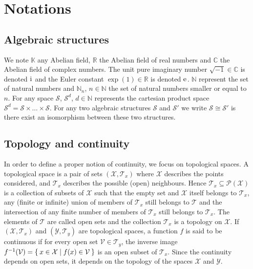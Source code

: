 
\section{Notations}

\subsection{Algebraic structures}
\label{sec:notations}
We note $\mathbb{K}$ any Abelian field, $\mathbb{R}$ the Abelian field of real numbers and $\mathbb{C}$ the Abelian field of complex numbers. The unit pure imaginary number $\sqrt{-1}\in\mathbb{C}$ is denoted ${\mathrm{i}\mkern1mu}$ and the Euler constant $\exp(1)\in\mathbb{R}$ is denoted $\mathrm{e}\mkern1mu$. $\mathbb{N}$ represent the set of natural numbers and $\mathbb{N}_n$, $n\in\mathbb{N}$ the set of natural numbers smaller or equal to $n$. For any space $\mathcal{S}$, $\mathcal{S}^d$, $d\in\mathbb{N}$ represents the cartesian product space $\mathcal{S}^d=\mathcal{S}\times \ldots \times \mathcal{S}$. For any two algebraic structures $\mathcal{S}$ and $\mathcal{S}'$ we write $\mathcal{S}\cong\mathcal{S}'$ is there exist an isomorphism between these two structures.

\subsection{Topology and continuity}
In order to define a proper notion of continuity, we focus on topological spaces. A topological space is a pair of sets $(\mathcal{X},\mathcal{T}_x)$ where $\mathcal{X}$ describes the points considered, and $\mathcal{T}_x$ describes the possible (open) neighbours. Hence $\mathcal{T}_x\subseteq{\mathcal{P}(\mathcal{X})}$ is a collection of subsets of $\mathcal{X}$ such that the empty set and $\mathcal{X}$ itself belongs to $\mathcal{T}_x$, any (finite or infinite) union of members of $\mathcal{T}_x$ still belongs to $\mathcal{T}$ and the intersection of any finite number of members of $\mathcal{T}_x$ still belongs to $\mathcal{T}_x$. The elements of $\mathcal{T}$ are called open sets and the collection $\mathcal{T}_x$ is a topology on $\mathcal{X}$. If $(\mathcal{X},\mathcal{T}_x)$ and $(\mathcal{Y},\mathcal{T}_y)$ are topological spaces, a function $f$ is said to be continuous if for every open set $\mathcal{V}\in \mathcal{T}_y$, the inverse image $f^{-1}(\mathcal{V}) = \Set{ x \in \mathcal{X} | f ( x ) \in \mathcal{V} }$ is an open subset of $\mathcal{T}_x$. Since the continuity depends on open sets, it depends on the topology of the spaces $\mathcal{X}$ and $\mathcal{Y}$.
